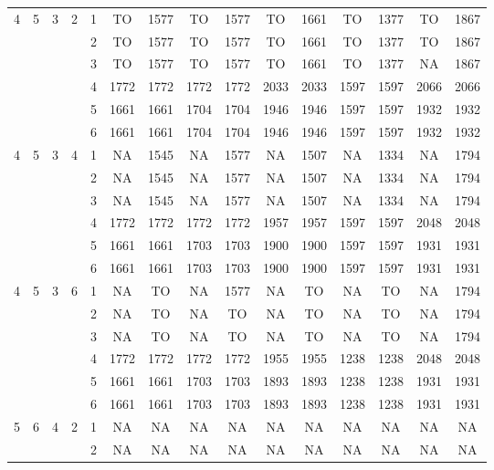 \begin{longtable}{|c|c|c|c|c|c c|c c|c c|c c|c c|}
\multirow{6}{*}{4} & \multirow{6}{*}{5} & \multirow{6}{*}{3} & \multirow{6}{*}{2} & 1 & TO & 1577 & TO & 1577 & TO & 1661 & TO & 1377 & TO & 1867 \\
 & & & & 2 & TO & 1577 & TO & 1577 & TO & 1661 & TO & 1377 & TO & 1867 \\
 & & & & 3 & TO & 1577 & TO & 1577 & TO & 1661 & TO & 1377 & NA & 1867 \\
 & & & & 4 & 1772 & 1772 & 1772 & 1772 & 2033 & 2033 & 1597 & 1597 & 2066 & 2066 \\
 & & & & 5 & 1661 & 1661 & 1704 & 1704 & 1946 & 1946 & 1597 & 1597 & 1932 & 1932 \\
 & & & & 6 & 1661 & 1661 & 1704 & 1704 & 1946 & 1946 & 1597 & 1597 & 1932 & 1932 \\
\hline
\multirow{6}{*}{4} & \multirow{6}{*}{5} & \multirow{6}{*}{3} & \multirow{6}{*}{4} & 1 & NA & 1545 & NA & 1577 & NA & 1507 & NA & 1334 & NA & 1794 \\
 & & & & 2 & NA & 1545 & NA & 1577 & NA & 1507 & NA & 1334 & NA & 1794 \\
 & & & & 3 & NA & 1545 & NA & 1577 & NA & 1507 & NA & 1334 & NA & 1794 \\
 & & & & 4 & 1772 & 1772 & 1772 & 1772 & 1957 & 1957 & 1597 & 1597 & 2048 & 2048 \\
 & & & & 5 & 1661 & 1661 & 1703 & 1703 & 1900 & 1900 & 1597 & 1597 & 1931 & 1931 \\
 & & & & 6 & 1661 & 1661 & 1703 & 1703 & 1900 & 1900 & 1597 & 1597 & 1931 & 1931 \\
\hline
\multirow{6}{*}{4} & \multirow{6}{*}{5} & \multirow{6}{*}{3} & \multirow{6}{*}{6} & 1 & NA & TO & NA & 1577 & NA & TO & NA & TO & NA & 1794 \\
 & & & & 2 & NA & TO & NA & TO & NA & TO & NA & TO & NA & 1794 \\
 & & & & 3 & NA & TO & NA & TO & NA & TO & NA & TO & NA & 1794 \\
 & & & & 4 & 1772 & 1772 & 1772 & 1772 & 1955 & 1955 & 1238 & 1238 & 2048 & 2048 \\
 & & & & 5 & 1661 & 1661 & 1703 & 1703 & 1893 & 1893 & 1238 & 1238 & 1931 & 1931 \\
 & & & & 6 & 1661 & 1661 & 1703 & 1703 & 1893 & 1893 & 1238 & 1238 & 1931 & 1931 \\
\hline
\multirow{6}{*}{5} & \multirow{6}{*}{6} & \multirow{6}{*}{4} & \multirow{6}{*}{2} & 1 & NA & NA & NA & NA & NA & NA & NA & NA & NA & NA \\
 & & & & 2 & NA & NA & NA & NA & NA & NA & NA & NA & NA & NA \\

\end{longtable}
